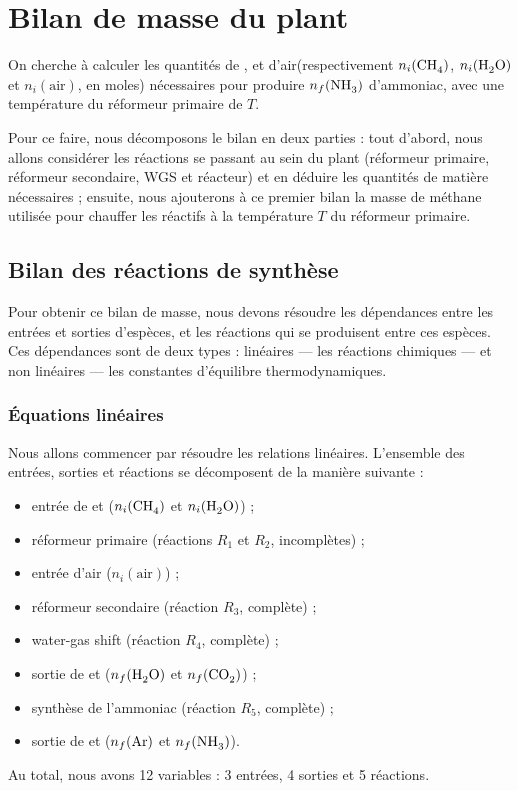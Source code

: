 \section{Bilan de masse du plant}

On cherche à calculer les quantités de ,  et d'air\footnotemark (respectivement $n_i(\ce{CH4})$, $n_i(\ce{H2O})$ et $n_i(\text{air})$, en moles) nécessaires pour produire $n_f(\ce{NH3})$\;\mole{} d'ammoniac, avec une température du réformeur primaire de $T$\;\kelvin{}.

Pour ce faire, nous décomposons le bilan en deux parties : tout d'abord, nous allons considérer les réactions se passant au sein du plant (réformeur primaire, réformeur secondaire, WGS et réacteur) et en déduire les quantités de matière nécessaires ; ensuite, nous ajouterons à ce premier bilan la masse de méthane utilisée pour chauffer les réactifs à la température $T$ du réformeur primaire.


\subsection{Bilan des réactions de synthèse}

Pour obtenir ce bilan de masse, nous devons résoudre les dépendances entre les entrées et sorties d'espèces, et les réactions qui se produisent entre ces espèces. Ces dépendances sont de deux types : linéaires --- les réactions chimiques --- et non linéaires --- les constantes d'équilibre thermodynamiques.

\subsubsection{Équations linéaires}

Nous allons commencer par résoudre les relations linéaires. L'ensemble des entrées, sorties et réactions se décomposent de la manière suivante :
\begin{itemize}
  \item entrée de  et  ($n_i(\ce{CH4})$ et $n_i(\ce{H2O})$) ;
  \item réformeur primaire (réactions $R_1$ et $R_2$, incomplètes) ;
  \item entrée d'air ($n_i(\text{air})$) ;
  \item réformeur secondaire (réaction $R_3$, complète) ;
  \item water-gas shift (réaction $R_4$, complète) ;
  \item sortie de  et  ($n_f(\ce{H2O})$ et $n_f(\ce{CO2})$) ;
  \item synthèse de l'ammoniac (réaction $R_5$, complète) ;
  \item sortie de  et  ($n_f(\ce{Ar})$ et $n_f(\ce{NH3})$).
\end{itemize}
Au total, nous avons 12 variables : 3 entrées, 4 sorties et 5 réactions.

